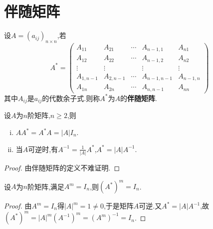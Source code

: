 \documentclass[../../main.tex]{subfiles}%
\begin{document}
\section{伴随矩阵}

\begin{definition}[伴随矩阵定义]\label{definition:伴随矩阵定义}
设$A=(a_{ij})_{n\times n}$,若
\[
A^* = 
\begin{pmatrix}
A_{11} & A_{21} & \cdots & A_{n - 1,1} & A_{n1} \\
A_{12} & A_{22} & \cdots & A_{n - 1,2} & A_{n2} \\
\vdots & \vdots & & \vdots & \vdots \\
A_{1,n - 1} & A_{2,n - 1} & \cdots & A_{n - 1,n - 1} & A_{n - 1,n} \\
A_{1n} & A_{2n} & \cdots & A_{n,n - 1} & A_{nn}
\end{pmatrix}
\]
其中\(A_{ij}\)是\(a_{ij}\)的代数余子式.则称\(A^*\)为\(A\)的\textbf{伴随矩阵}.
\end{definition}

\begin{theorem}\label{theorem:伴随矩阵的基本性质}
设$A$为$n$阶矩阵,$n\geqslant  2$,则
\begin{enumerate}[(i)]
\item $AA^*=A^*A=\left| A \right|I_n$.
\item\label{伴随矩阵基本性质2} 当$A$可逆时,有$A^{-1}=\frac{1}{\left| A \right|}A^*$,$A^*=|A|A^{-1}$.
\end{enumerate}
\end{theorem}
\begin{proof}
由伴随矩阵的定义不难证明.
\end{proof}

\begin{proposition}
设\(A\)为\(n\)阶矩阵,满足\(A^m = I_n\),则\((A^*)^m = I_n\).
\end{proposition}
\begin{proof}
由\(A^m = I_n\)得\(|A|^m = 1\ne 0\),于是矩阵$A$可逆.又\(A^* = |A|A^{-1}\),故$(A^*)^m = |A|^m(A^{-1})^m = (A^m)^{-1} = I_n$.
\end{proof}
\end{document}
